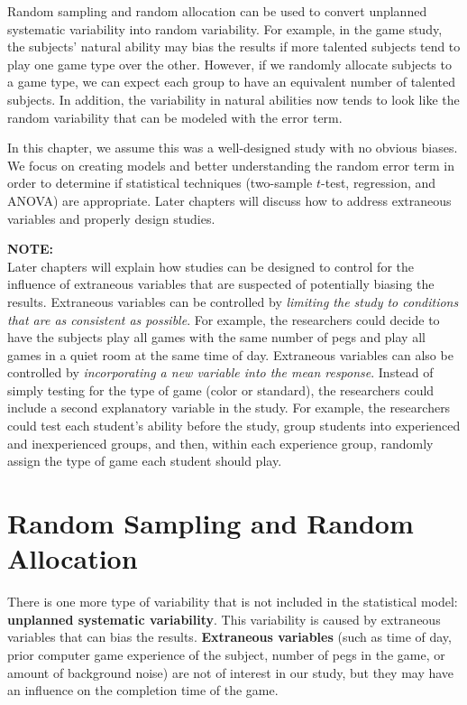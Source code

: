 \documentclass[
]{report}
\begin{document}
Random sampling and random allocation can be used to convert unplanned systematic variability into random variability. For example, in the game study, the subjects' natural ability may bias the results if more talented subjects tend to play one game type over the other. However, if we randomly allocate subjects to a game type, we can expect each group to have an equivalent number of talented subjects. In addition, the variability in natural abilities now tends to look like the random variability that can be modeled with the error term.

In this chapter, we assume this was a well-designed study with no obvious biases. We focus on creating models and better understanding the random error term in order to determine if statistical techniques (two-sample \(t\)-test, regression, and ANOVA) are appropriate. Later chapters will discuss how to address extraneous variables and properly design studies.

\large

\textbf{NOTE:}\\
Later chapters will explain how studies can be designed to control for the influence of extraneous variables that are suspected of potentially biasing the results. Extraneous variables can be controlled by \emph{limiting the study to conditions that are as consistent as possible}. For example, the researchers could decide to have the subjects play all games with the same number of pegs and play all games in a quiet room at the same time of day. Extraneous variables can also be controlled by \emph{incorporating a new variable into the mean response}. Instead of simply testing for the type of game (color or standard), the researchers could include a second explanatory variable in the study. For example, the researchers could test each student's ability before the study, group students into experienced and inexperienced groups, and then, within each experience group, randomly assign the type of game each student should play.
\normalsize

\section{\texorpdfstring{\textbf{Random Sampling and Random Allocation}}{Random Sampling and Random Allocation}}\label{random-sampling-and-random-allocation}

There is one more type of variability that is not included in the statistical model: \textbf{unplanned systematic variability}. This variability is caused by extraneous variables that can bias the results. \textbf{Extraneous variables} (such as time of day, prior computer game experience of the subject, number of pegs in the game, or amount of background noise) are not of interest in our study, but they may have an influence on the completion time of the game.
\end{document}
